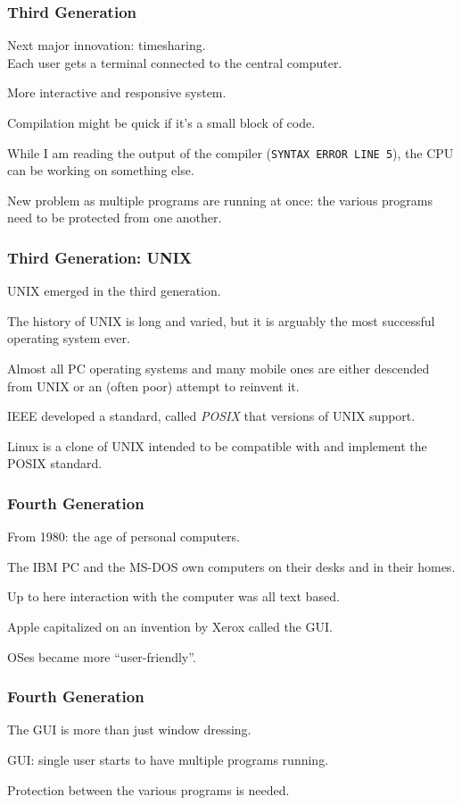 \begin{frame}
\frametitle{Third Generation}

Next major innovation: \alert{timesharing}.\\
\quad Each user gets a terminal connected to the central computer.

More interactive and responsive system. 

Compilation might be quick if it's a small block of code. 

While I am reading the output of the compiler (\texttt{SYNTAX ERROR LINE 5}), the CPU can be working on something else. 

New problem as multiple programs are running at once: the various programs need to be protected from one another.

\end{frame}

\begin{frame}
\frametitle{Third Generation: UNIX}

UNIX emerged in the third generation. 

The history of UNIX is long and varied, but it is arguably the most successful operating system ever. 

Almost all PC operating systems and many mobile ones are either descended from UNIX or an (often poor) attempt to reinvent it. 

IEEE developed a standard, called \textit{POSIX} that versions of UNIX support.

Linux is a clone of UNIX intended to be compatible with and implement the POSIX standard.

\end{frame}

\begin{frame}
\frametitle{Fourth Generation}
From 1980: the age of personal computers. 

The IBM PC and the MS-DOS own computers on their desks and in their homes.

Up to here interaction with the computer was all text based.

Apple capitalized on an invention by Xerox called the GUI.

OSes became more ``user-friendly''.

\end{frame}

\begin{frame}
\frametitle{Fourth Generation}

The GUI is more than just window dressing.

GUI: single user starts to have multiple programs running.

Protection between the various programs is needed.
\end{frame}

